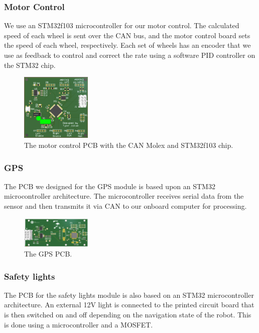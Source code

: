 \subsubsection{Motor Control}
We use an STM32f103 microcontroller for our motor control. The calculated speed of each wheel is sent over the CAN bus, and the motor control board sets the speed of each wheel, respectively. Each set of wheels has an encoder that we use as feedback to control and correct the rate using a software PID controller on the STM32 chip.

\begin{figure}[h]
\centering
\includegraphics[width=0.3\textwidth]{images/electrical/motorControl.PNG}
\caption{The motor control PCB with the CAN Molex and STM32f103 chip.}
\end{figure}

\subsubsection{GPS}
The PCB we designed for the GPS module is based upon an STM32 microcontroller architecture. The microcontroller receives serial data from the sensor and then transmits it via CAN to our onboard computer for processing.

\begin{figure}[h]
\centering
\includegraphics[width=0.3\textwidth]{images/electrical/gps.png}
\caption{The GPS PCB.}
\end{figure}

\subsubsection{Safety lights}
The PCB for the safety lights module is also based on an STM32 microcontroller architecture. An external 12V light is connected to the printed circuit board that is then switched on and off depending on the navigation state of the robot. This is done using a microcontroller and a MOSFET.

